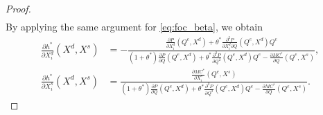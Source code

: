 \documentclass[11pt, a4paper]{article}
\theoremstyle{remark}
\begin{document}
\begin{proof}
\begin{align}
\end{align}
By applying the same argument for \eqref{eq:foc_beta}, we obtain 
\begin{align}
    \frac{\partial h^{*}}{\partial X^{d}_{i}}(X^{d}, X^{s}) &= -\frac{\frac{\partial P}{\partial X^{d}_{i}}(Q^e, X^{d}) + \theta^{*}\frac{\partial^2 P}{\partial X^{d}_{i}\partial Q}(Q^e, X^{d})Q^e }{(1+\theta^{*})\frac{\partial P}{\partial Q}(Q^e, X^{d}) + \theta^{*}\frac{\partial^2 P}{\partial Q^2}(Q^e, X^{d})Q^e - \frac{\partial MC^{*}}{\partial Q}(Q^e, X^{s})},\label{eq:foc_derivative_demand_beta}\\
    \frac{\partial h^{*}}{\partial X^{s}_{i}}(X^{d}, X^{s}) & = \frac{\frac{\partial MC^{*}}{\partial X^{s}_{i}}(Q^e, X^{s})}{(1+\theta^{*})\frac{\partial P}{\partial Q}(Q^e, X^{d}) + \theta^{*}\frac{\partial^2 P}{\partial Q^2}(Q^e, X^{d})Q^e - \frac{\partial MC^{*}}{\partial Q}(Q^e, X^{s})}.\label{eq:foc_derivative_supply_beta}
\end{align}


\end{proof}
\end{document}
